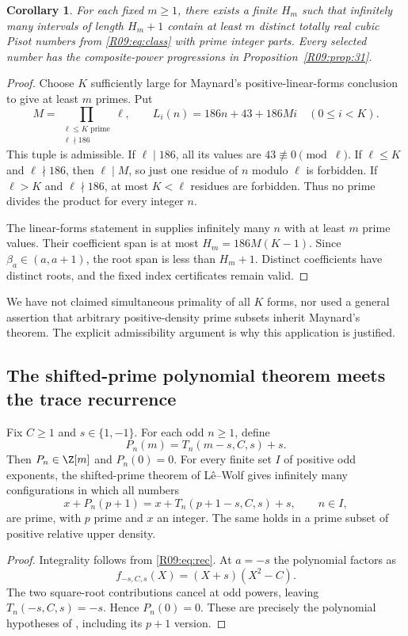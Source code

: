 \documentclass[11pt,a4paper]{article}
\newtheorem{corollary}[theorem]{Corollary}\newtheorem{mainthm}[theorem]{Theorem}
\theoremstyle{definition}\newtheorem{definition}[theorem]{Definition}
\theoremstyle{remark}\newtheorem{remark}[theorem]{Remark}
\begin{document}
\begin{corollary}\label{R09:cor:clusters}
For each fixed $m\ge1$, there exists a finite $H_m$ such that infinitely
many intervals of length $H_m+1$ contain at least $m$ distinct totally
real cubic Pisot numbers from \eqref{R09:eq:class} with prime integer parts.
Every selected number has the composite-power progressions in
Proposition~\ref{R09:prop:31}.
\end{corollary}
\begin{proof}
Choose $K$ sufficiently large for Maynard's positive-linear-forms
conclusion to give at least $m$ primes. Put
\[
 M=\prod_{\substack{\ell\le K\text{ prime}\\\ell\nmid186}}\ell,
 \qquad L_i(n)=186n+43+186Mi\quad(0\le i<K).
\]
This tuple is admissible. If $\ell\mid186$, all its values are
$43\not\equiv0\pmod\ell$. If $\ell\le K$ and $\ell\nmid186$, then
$\ell\mid M$, so just one residue of $n$ modulo $\ell$ is forbidden.
If $\ell>K$ and $\ell\nmid186$, at most $K<\ell$ residues are forbidden.
Thus no prime divides the product for every integer $n$.

The linear-forms statement in \cite[p.~2]{Maynard} supplies infinitely
many $n$ with at least $m$ prime values. Their coefficient span is at
most $H_m=186M(K-1)$. Since $\beta_a\in(a,a+1)$, the root span is less
than $H_m+1$. Distinct coefficients have distinct roots, and the fixed
index certificates remain valid.
\end{proof}

We have not claimed simultaneous primality of all $K$ forms, nor used
a general assertion that arbitrary positive-density prime subsets
inherit Maynard's theorem. The explicit admissibility argument is why
this application is justified.

\subsection{The shifted-prime polynomial theorem meets the trace recurrence}

\begin{proposition}\label{R09:prop:normalize}
Fix $C\ge1$ and $s\in\{1,-1\}$. For each odd $n\ge1$, define
\[
 P_n(m)=T_n(m-s,C,s)+s.
\]
Then $P_n\in\Z[m]$ and $P_n(0)=0$. For every finite set $I$ of positive
odd exponents, the shifted-prime theorem of L\^e--Wolf gives infinitely
many configurations in which all numbers
\begin{equation}\label{R09:eq:lw}
 x+P_n(p+1)=x+T_n(p+1-s,C,s)+s,\qquad n\in I,
\end{equation}
are prime, with $p$ prime and $x$ an integer. The same holds in a prime
subset of positive relative upper density.
\end{proposition}
\begin{proof}
Integrality follows from \eqref{R09:eq:rec}. At $a=-s$ the polynomial
factors as
\[
 f_{-s,C,s}(X)=(X+s)(X^2-C).
\]
The two square-root contributions cancel at odd powers, leaving
$T_n(-s,C,s)=-s$. Hence $P_n(0)=0$. These are precisely the polynomial
hypotheses of \cite[Theorem 4]{R09-LW}, including its $p+1$ version.
\end{proof}
\end{document}

